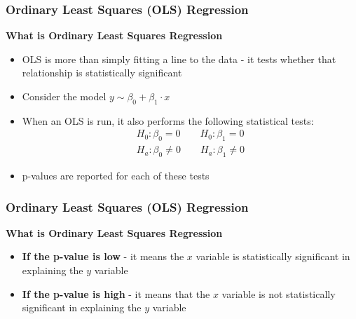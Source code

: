 \documentclass{beamer}
\begin{document}
\begin{frame}
\frametitle{Ordinary Least Squares (OLS) Regression}
\textbf{What is Ordinary Least Squares Regression}\\
\vspace{0.5cm}
\begin{itemize}
\item OLS is more than simply fitting a line to the data - it tests whether that relationship is statistically significant
\vspace{0.2cm}
\item Consider the model $y \sim \beta_0 + \beta_1 \cdot x$
\vspace{0.2cm}
\item When an OLS is run, it also performs the following statistical tests:
\begin{align*}
H_0: \beta_0 = 0 \quad\quad H_0: \beta_1 = 0\\
H_a: \beta_0 \neq 0 \quad\quad H_a: \beta_1 \neq 0
\end{align*}
\item p-values are reported for each of these tests
\end{itemize}
\end{frame}


\begin{frame}
\frametitle{Ordinary Least Squares (OLS) Regression}
\textbf{What is Ordinary Least Squares Regression}\\
\vspace{1cm}
\begin{tcolorbox}
\begin{itemize}
\item \textbf{If the p-value is low} - it means the $x$ variable is statistically significant in explaining the $y$ variable
\vspace{0.5cm}
\item \textbf{If the p-value is high} - it means that the $x$ variable is not statistically significant in explaining the $y$ variable
\end{itemize}
\end{tcolorbox}
\end{frame}

\end{document}
